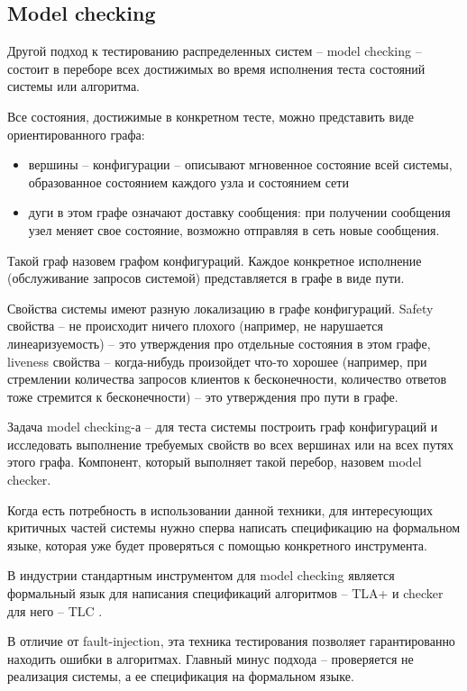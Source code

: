 \subsection{Model checking}

Другой подход к тестированию распределенных систем – model checking – состоит в переборе всех достижимых во время исполнения теста состояний системы или алгоритма. 

Все состояния, достижимые в конкретном тесте, можно представить  виде ориентированного графа: 
\begin{itemize}
    \item вершины – конфигурации – описывают мгновенное состояние всей системы, образованное состоянием каждого узла и состоянием сети
    \item дуги в этом графе означают доставку сообщения: при получении сообщения узел меняет свое состояние, возможно отправляя в сеть новые сообщения. 
\end{itemize}

Такой граф назовем графом конфигураций. Каждое конкретное исполнение (обслуживание запросов системой) представляется в графе в виде пути.

Свойства системы имеют разную локализацию в графе конфигураций. Safety свойства – не происходит ничего плохого (например, не нарушается линеаризуемость) – это утверждения про отдельные состояния в этом графе, liveness свойства – когда-нибудь произойдет что-то хорошее (например, при стремлении количества запросов клиентов к бесконечности, количество ответов тоже стремится к бесконечности) – это утверждения про пути в графе.

Задача model checking-а – для теста системы построить граф конфигураций и исследовать выполнение требуемых свойств во всех вершинах или на всех путях этого графа. Компонент, который выполняет такой перебор, назовем model checker.

Когда есть потребность в использовании данной техники, для интересующих критичных частей системы нужно сперва написать спецификацию на формальном языке, которая уже будет проверяться с помощью конкретного инструмента.

В индустрии стандартным инструментом для model checking является формальный язык для написания спецификаций алгоритмов – TLA+ и checker для него – TLC \cite{tla}.

В отличие от fault-injection, эта техника тестирования позволяет гарантированно находить ошибки в алгоритмах. Главный минус подхода – проверяется не реализация системы, а ее спецификация на формальном языке.
